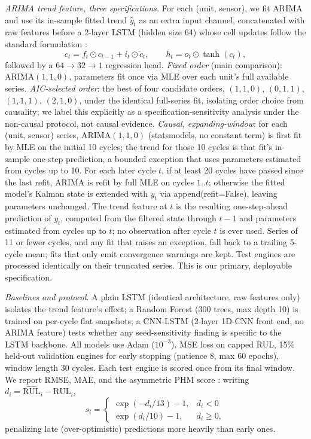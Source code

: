 \documentclass[conference]{IEEEtran}
\begin{document}
\emph{ARIMA trend feature, three specifications.} For each (unit, sensor), we fit ARIMA and use its in-sample fitted trend $\hat{y}_t$ as an extra input channel, concatenated with raw features before a 2-layer LSTM (hidden size 64) whose cell updates follow the standard formulation \cite{lstm1997}:
\begin{equation}
c_t = f_t \odot c_{t-1} + i_t \odot \tilde{c}_t, \qquad h_t = o_t \odot \tanh(c_t),
\end{equation}
followed by a $64{\to}32{\to}1$ regression head. \emph{Fixed order} (main comparison): ARIMA$(1,1,0)$, parameters fit once via MLE over each unit's full available series. \emph{AIC-selected order}: the best of four candidate orders, $(1,1,0)$, $(0,1,1)$, $(1,1,1)$, $(2,1,0)$, under the identical full-series fit, isolating order choice from causality; we label this explicitly as a specification-sensitivity analysis under the non-causal protocol, not causal evidence. \emph{Causal, expanding-window}: for each (unit, sensor) series, ARIMA$(1,1,0)$ (statsmodels, no constant term) is first fit by MLE on the initial 10 cycles; the trend for those 10 cycles is that fit's in-sample one-step prediction, a bounded exception that uses parameters estimated from cycles up to 10. For each later cycle $t$, if at least 20 cycles have passed since the last refit, ARIMA is refit by full MLE on cycles $1..t$; otherwise the fitted model's Kalman state is extended with $y_t$ via append(refit=False), leaving parameters unchanged. The trend feature at $t$ is the resulting one-step-ahead prediction of $y_t$, computed from the filtered state through $t-1$ and parameters estimated from cycles up to $t$; no observation after cycle $t$ is ever used. Series of 11 or fewer cycles, and any fit that raises an exception, fall back to a trailing 5-cycle mean; fits that only emit convergence warnings are kept. Test engines are processed identically on their truncated series. This is our primary, deployable specification.

\emph{Baselines and protocol.} A plain LSTM (identical architecture, raw features only) isolates the trend feature's effect; a Random Forest (300 trees, max depth 10) is trained on per-cycle flat snapshots; a CNN-LSTM (2-layer 1D-CNN front end, no ARIMA feature) \cite{cnnlstm2024} tests whether any seed-sensitivity finding is specific to the LSTM backbone. All models use Adam ($10^{-3}$), MSE loss on capped RUL, 15\% held-out validation engines for early stopping (patience 8, max 60 epochs), window length 30 cycles. Each test engine is scored once from its final window. We report RMSE, MAE, and the asymmetric PHM score \cite{saxena2008}: writing $d_i=\widehat{\mathrm{RUL}}_i-\mathrm{RUL}_i$,
\begin{equation}
s_i = \begin{cases} \exp(-d_i/13)-1, & d_i<0 \\ \exp(d_i/10)-1, & d_i\geq 0, \end{cases}
\end{equation}
penalizing late (over-optimistic) predictions more heavily than early ones.
\end{document}
